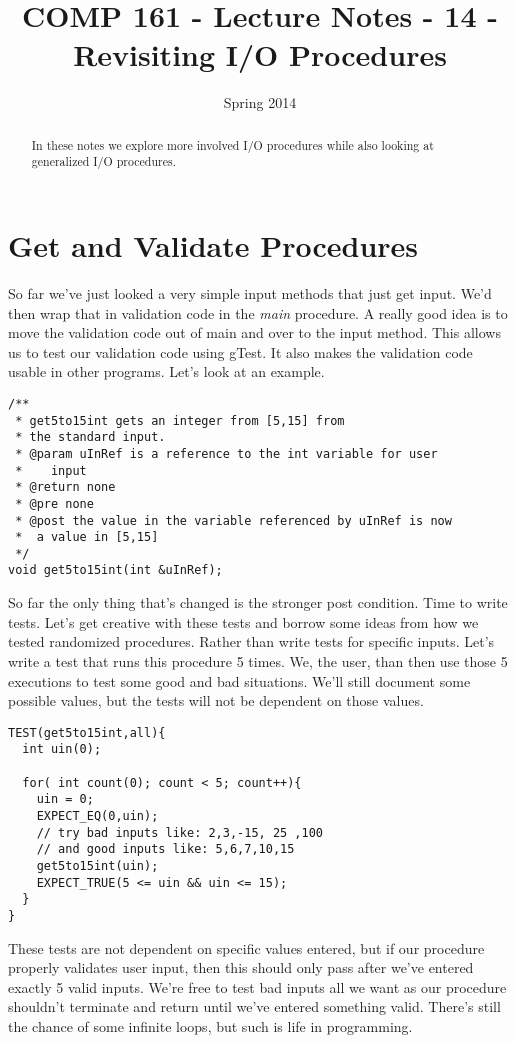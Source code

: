 \documentclass[]{tufte-handout}
\title{COMP 161 - Lecture Notes - 14 - Revisiting I/O Procedures}
\date{Spring 2014}
\begin{document}
 
\maketitle

\begin{abstract}
In these notes we explore more involved I/O procedures while also looking at generalized I/O procedures.
\end{abstract}

\section{Get and Validate Procedures}

So far we've just looked a very simple input methods that just get input.  We'd then wrap that in validation code in the \textit{main} procedure.  A really good idea is to move the validation code out of main and over to the input method.  This allows us to test our validation code using gTest. It also makes the validation code usable in other programs.  Let's look at an example.

\begin{verbatim}
/**
 * get5to15int gets an integer from [5,15] from
 * the standard input.
 * @param uInRef is a reference to the int variable for user
 *    input
 * @return none
 * @pre none
 * @post the value in the variable referenced by uInRef is now
 *  a value in [5,15]
 */
void get5to15int(int &uInRef);
\end{verbatim}
So far the only thing that's changed is the stronger post condition. Time to write tests. Let's get creative with these tests and borrow some ideas from how we tested randomized procedures. Rather than write tests for specific inputs.  Let's write a test that runs this procedure 5 times.  We, the user, than then use those 5  executions to test some good and bad situations.  We'll still document some possible values, but the tests will not be dependent on those values.

\begin{verbatim}
TEST(get5to15int,all){
  int uin(0);
  
  for( int count(0); count < 5; count++){
    uin = 0;
    EXPECT_EQ(0,uin);
    // try bad inputs like: 2,3,-15, 25 ,100
    // and good inputs like: 5,6,7,10,15 
    get5to15int(uin);
    EXPECT_TRUE(5 <= uin && uin <= 15);
  }
}
\end{verbatim}
These tests are not dependent on specific values entered,  but if our procedure properly validates user input, then this should only pass after we've entered exactly 5 valid inputs.  We're free to test bad inputs all we want as our procedure shouldn't terminate and return until we've entered something valid. There's still the chance of some infinite loops, but such is life in programming. 
\end{document}
